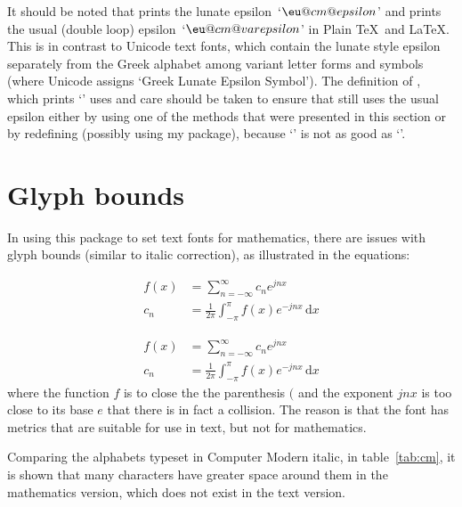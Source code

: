 \documentclass{ltxdockit}
\makeatletter
\def\topbottomrule{\noalign{\ifnum0=`}\fi \@aboverulesep=\aboverulesep
  \global\@belowrulesep=\belowrulesep \global\@thisruleclass=\@ne
  \@ifnextchar[{\@BTrule}{\@BTrule[\heavyrulewidth]}}
\makeatother
\begin{document}
\makeatletter It should be noted that  prints the lunate
epsilon~‘$\eu@cm@epsilon$’ and  prints the usual
(double loop) epsilon~‘$\eu@cm@varepsilon$’ in Plain \TeX\ and
\LaTeX. This is in contrast to Unicode text fonts, which contain the
lunate style epsilon separately from the Greek alphabet among variant
letter forms and symbols (where Unicode assigns ‘Greek Lunate Epsilon
Symbol’). The definition of , which prints ‘\LaTeXe’ uses
 and care should be taken to ensure that 
still uses the usual epsilon either by using one of the methods that
were presented in this section or by redefining  (possibly
using my  package), because
{\setLaTeXee{\mbox{$\varepsilon$}}‘\LaTeXe’} is not as good as
{\setLaTeXee{\mbox{$\epsilon$}}‘\LaTeXe’}.  \makeatother

\section{Glyph bounds}\label{sec:glyphbounds}

In using this package to set text fonts for mathematics, there are
issues with glyph bounds (similar to italic correction), as
illustrated in the equations:
\begin{example}
  \begin{align}
    f(x) &= \sum_{n = -\infty}^\infty c_{n}e^{jnx}            \\
    c_{n} &= \frac{1}{2π}\int_{-π}^{π}f(x)e^{-jnx}\,\mathrm dx
  \end{align}
\end{example}
\begin{align}
  f(x) &= \sum_{n = -\infty}^\infty c_{n}e^{jnx}\label{eq:1}\\
  c_{n} &= \frac 1{2π}\int_{-π}^{π}f(x)e^{-jnx}\,\mathrm
  dx\label{eq:2}
\end{align}
where the function $f$ is to close the the parenthesis $($ and the
exponent $jnx$ is too close to its base $e$ that there is in fact a
collision. The reason is that the font has metrics that are suitable
for use in text, but not for mathematics.

Comparing the alphabets typeset in Computer Modern italic, in
table~\ref{tab:cm}, it is shown that many characters have greater
space around them in the mathematics version, which does not exist in
the text version.

\begin{table}
  \caption{Computer Modern Italic in text and mathematics.\label{tab:cm}}
\end{table}
\end{document}
